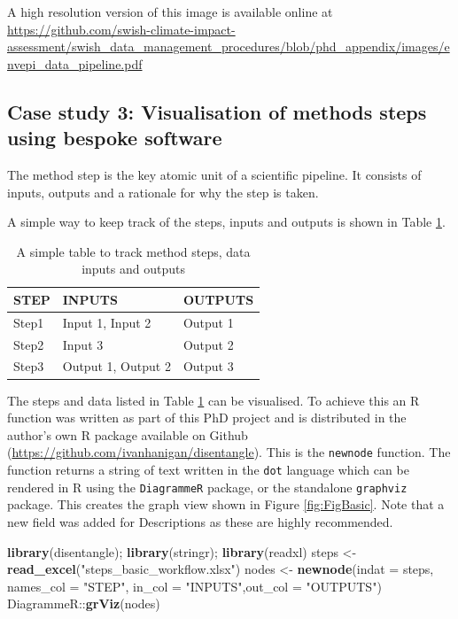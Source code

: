 \documentclass[11pt,a4paper]{article}
\newenvironment{Shaded}{\begin{snugshade}}{\end{snugshade}}
\newcommand{\KeywordTok}[1]{\textcolor[rgb]{0.13,0.29,0.53}{\textbf{{#1}}}}
\newcommand{\DataTypeTok}[1]{\textcolor[rgb]{0.13,0.29,0.53}{{#1}}}
\newcommand{\StringTok}[1]{\textcolor[rgb]{0.31,0.60,0.02}{{#1}}}
\newcommand{\NormalTok}[1]{{#1}}
\begin{document}
A high resolution version of this image is available online at
\href{https://github.com/swish-climate-impact-assessment/swish_data_management_procedures/blob/phd_appendix/images/envepi_data_pipeline.pdf}{\url{https://github.com/swish-climate-impact-assessment/swish_data_management_procedures/blob/phd_appendix/images/envepi_data_pipeline.pdf}}

\subsection{Case study 3: Visualisation of methods steps using bespoke
software}\label{case-study-3-visualisation-of-methods-steps-using-bespoke-software}

The method step is the key atomic unit of a scientific pipeline. It
consists of inputs, outputs and a rationale for why the step is taken.

A simple way to keep track of the steps, inputs and outputs is shown in
Table \ref{tab:TableBasic}.

\begin{table}[!h]
\centering
\caption{A simple table to track method steps, data inputs and outputs} 
\label{tab:TableBasic}
\begin{tabular}{p{.6in}p{2in}p{2in}}
  \hline
STEP & INPUTS & OUTPUTS \\ 
  \hline
Step1 & Input 1, Input 2 & Output 1 \\ 
  Step2 & Input 3 & Output 2 \\ 
  Step3 & Output 1, Output 2 & Output 3 \\ 
   \hline
\end{tabular}
\end{table}

The steps and data listed in Table \ref{tab:TableBasic} can be
visualised. To achieve this an R function was written as part of this
PhD project and is distributed in the author's own R package available
on Github (\url{https://github.com/ivanhanigan/disentangle}). This is
the \texttt{newnode} function. The function returns a string of text
written in the \texttt{dot} language which can be rendered in R using
the \texttt{DiagrammeR} package, or the standalone \texttt{graphviz}
package. This creates the graph view shown in Figure \ref{fig:FigBasic}.
Note that a new field was added for Descriptions as these are highly
recommended.

\begin{Shaded}
\begin{Highlighting}[]
\KeywordTok{library}\NormalTok{(disentangle); }\KeywordTok{library}\NormalTok{(stringr); }\KeywordTok{library}\NormalTok{(readxl)}
\NormalTok{steps <-}\StringTok{ }\KeywordTok{read_excel}\NormalTok{(}\StringTok{"steps_basic_workflow.xlsx"}\NormalTok{)}
\NormalTok{nodes <-}\StringTok{ }\KeywordTok{newnode}\NormalTok{(}\DataTypeTok{indat =} \NormalTok{steps, }\DataTypeTok{names_col =} \StringTok{"STEP"}\NormalTok{,}
                 \DataTypeTok{in_col =} \StringTok{"INPUTS"}\NormalTok{,}\DataTypeTok{out_col =} \StringTok{"OUTPUTS"}\NormalTok{)}
\NormalTok{DiagrammeR::}\KeywordTok{grViz}\NormalTok{(nodes)}
\end{Highlighting}
\end{Shaded}
\end{document}
